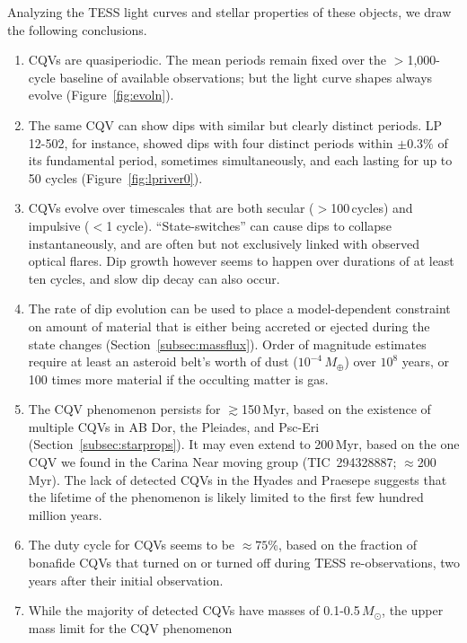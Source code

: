 \documentclass[11pt,twocolumn,tighten]{aastex63}
\begin{document}
Analyzing the TESS light curves and stellar properties of these
objects, we draw the following conclusions.

\begin{enumerate}[leftmargin=*]
  \item CQVs are quasiperiodic.  The mean periods 
    remain fixed over the $>$1{,}000-cycle baseline of available
    observations; but the light curve shapes always evolve (Figure~\ref{fig:evoln}).
  \item The same CQV can show dips with similar but clearly
    distinct periods.  LP 12-502, for instance, showed dips with four
    distinct periods within $\pm 0.3\%$ of its fundamental period,
    sometimes simultaneously, and each lasting for up to 50 cycles
    (Figure~\ref{fig:lpriver0}).
    \item CQVs evolve over timescales that are both secular
    ($>$100\,cycles) and impulsive ($<$1 cycle).  ``State-switches''
    can cause dips to collapse instantaneously, and are often but not
    exclusively linked with observed optical flares.  Dip growth
    however seems to happen over durations of at least ten cycles, and
    slow dip decay can also occur.
    \item The rate of dip evolution can be used to place a model-dependent
    constraint on amount of material that is either being accreted or ejected
    during the state changes (Section~\ref{subsec:massflux}).
    Order of magnitude estimates require at least an asteroid belt's worth
    of dust ($10^{-4}$\,$M_\oplus$) over $10^8$ years, or 100 times more 
    material if the occulting matter is gas.
  \item The CQV phenomenon persists for $\gtrsim$150\,Myr, based on
    the existence of multiple CQVs in AB Dor, the Pleiades, and
    Psc-Eri (Section~\ref{subsec:starprops}).  It may even extend to
    200\,Myr, based on the one CQV we found in the Carina Near
    moving group (TIC~294328887; $\approx$200\,Myr).  The lack of
    detected CQVs in the Hyades and Praesepe suggests that the
    lifetime of the phenomenon is likely limited to the first few
    hundred million years.
    \item The duty cycle for CQVs seems to be $\approx$$75$\%, based on
    the fraction of bonafide CQVs that turned on or turned off during
    TESS re-observations, two years after their initial observation.
    \item While the majority of detected CQVs have masses of
    0.1-0.5\,$M_\odot$, the upper mass limit for the CQV phenomenon
$$
\end{enumerate}
\end{document}
